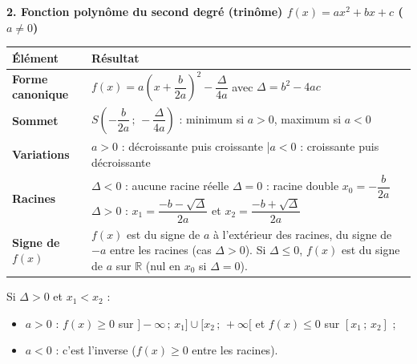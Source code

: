 \documentclass[11pt]{article}
\begin{document}
\textbf{2. Fonction polynôme du second degré (trinôme) $f(x)=ax^2+bx+c$ ($a\neq0$)}\par
\begin{center}
\begin{tabularx}{\linewidth}{|>{\bfseries}l|X|}\hline
\rowcolor{popblueL} \textbf{Élément} & \textbf{Résultat} \\\hline
\textbf{Forme canonique} & $f(x)=a\left(x+\dfrac{b}{2a}\right)^2-\dfrac{\Delta}{4a}$ avec $\Delta=b^2-4ac$ \\\hline
\textbf{Sommet} & $S\left(-\dfrac{b}{2a}\,;\,-\dfrac{\Delta}{4a}\right)$ : minimum si $a>0$, maximum si $a<0$ \\\hline
\textbf{Variations} & $a>0$ : décroissante puis croissante \quad|\quad $a<0$ : croissante puis décroissante \\\hline
\textbf{Racines} & $\Delta<0$ : aucune racine réelle \quad $\Delta=0$ : racine double $x_0=-\dfrac{b}{2a}$ \quad $\Delta>0$ : $x_{1}=\dfrac{-b-\sqrt{\Delta}}{2a}$ et $x_{2}=\dfrac{-b+\sqrt{\Delta}}{2a}$ \\\hline
\textbf{Signe de $f(x)$} & $f(x)$ est du signe de $a$ à l'extérieur des racines, du signe de $-a$ entre les racines (cas $\Delta>0$). Si $\Delta\le 0$, $f(x)$ est du signe de $a$ sur $\mathbb{R}$ (nul en $x_0$ si $\Delta=0$). \\\hline
\end{tabularx}
\end{center}

\begin{aretenir}
Si $\Delta>0$ et $x_1<x_2$ :
\begin{itemize}
  \item $a>0$ : $f(x)\ge 0$ sur $]-\infty\,;\,x_1]\cup[x_2\,;\,+\infty[$ et $f(x)\le 0$ sur $[x_1\,;\,x_2]$ ;
  \item $a<0$ : c'est l'inverse ($f(x)\ge 0$ entre les racines).
\end{itemize}
\end{aretenir}
\end{document}
